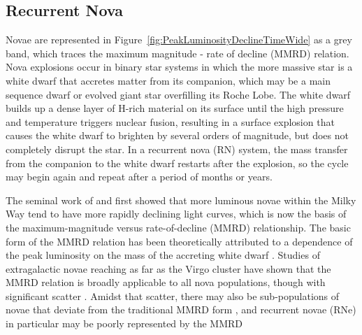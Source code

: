 


\subsection{Recurrent Nova}

Novae are represented in
Figure~\ref{fig:PeakLuminosityDeclineTimeWide} as a grey band, which
traces the maximum magnitude - rate of decline (MMRD) relation.  Nova
explosions occur in binary star systems in which the more massive star
is a white dwarf that accretes matter from its companion, which may be
a main sequence dwarf or evolved giant star overfilling its Roche
Lobe. The white dwarf builds up a dense layer of H-rich material on
its surface until the high pressure and temperature triggers nuclear
fusion, resulting in a surface explosion that causes the white dwarf
to brighten by several orders of magnitude, but does not completely
disrupt the star. In a recurrent nova (RN) system, the mass transfer
from the companion to the white dwarf restarts after the explosion, so
the cycle may begin again and repeat after a period of months or
years.

The seminal work of \citet{Zwicky:1936} and \citet{McLaughlin:1939}
first showed that more luminous novae within the Milky Way tend to
have more rapidly declining light curves, which is now the basis of
the maximum-magnitude versus rate-of-decline (MMRD) relationship. The
basic form of the MMRD relation has been theoretically attributed to a
dependence of the peak luminosity on the mass of the accreting white
dwarf \citep[e.g.][]{Livio:1992}.  Studies of extragalactic novae
reaching as far as the Virgo cluster have shown that the MMRD relation
is broadly applicable to all nova populations, though with significant
scatter
\citep[e.g.][]{Ciardullo:1990,DellaValle:1995,Ferrarese:2003,Shafter:2011}.
Amidst that scatter, there may also be sub-populations of novae that
deviate from the traditional MMRD form \citep{Kasliwal:2011a}, and
recurrent novae (RNe) in particular may be poorly represented by the
MMRD \citep{Shafter:2011,Hachisu:2015}

